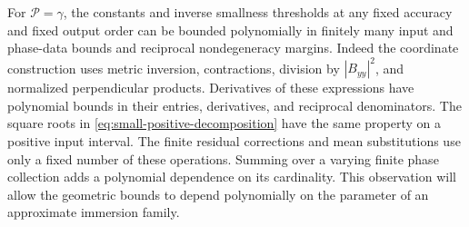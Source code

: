 \begin{remark}\label{rem:small-polynomial-control}
For $\mathcal P=\gamma$, the constants and inverse smallness thresholds at any
fixed accuracy and fixed output order can be bounded polynomially in finitely
many input and phase-data bounds and reciprocal nondegeneracy margins.
Indeed the coordinate construction uses metric inversion, contractions,
division by $|B_{yy}|^2$, and normalized perpendicular products. Derivatives of
these expressions have polynomial bounds in their entries, derivatives, and
reciprocal denominators. The square roots in
\eqref{eq:small-positive-decomposition} have the same property on a positive
input interval. The finite residual corrections and mean substitutions use
only a fixed number of these operations. Summing over a varying finite phase
collection adds a polynomial dependence on its cardinality. This observation
will allow the geometric bounds to depend polynomially on the parameter of an
approximate immersion family.
\end{remark}
